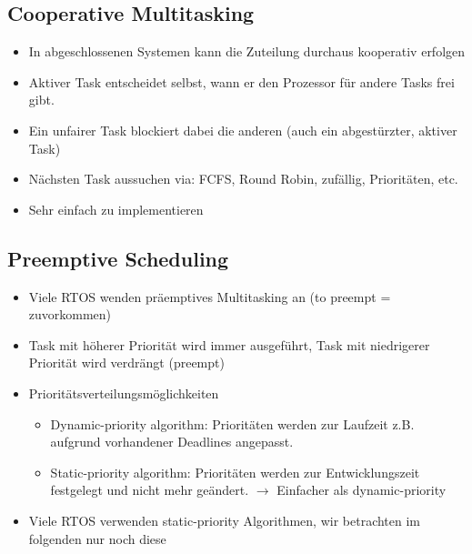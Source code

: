 \subsection{Cooperative Multitasking}
\begin{itemize}
  \item In abgeschlossenen Systemen kann die Zuteilung durchaus kooperativ erfolgen
  \item Aktiver Task entscheidet selbst, wann er den Prozessor für andere Tasks frei gibt.
  \item Ein unfairer Task blockiert dabei die anderen (auch ein abgestürzter, aktiver Task)
  \item Nächsten Task aussuchen via: FCFS, Round Robin, zufällig, Prioritäten, etc.
  \item Sehr einfach zu implementieren
\end{itemize}

\subsection{Preemptive Scheduling}
\begin{itemize}
  \item Viele RTOS wenden präemptives Multitasking an (to preempt = zuvorkommen)
  \item Task mit höherer Priorität wird immer ausgeführt, Task mit niedrigerer Priorität wird verdrängt (preempt)
  \item Prioritätsverteilungsmöglichkeiten
  \begin{itemize}
    \item Dynamic-priority algorithm: Prioritäten werden zur Laufzeit z.B. aufgrund vorhandener Deadlines angepasst.
    \item Static-priority algorithm: Prioritäten werden zur Entwicklungszeit festgelegt und nicht mehr geändert. $\rightarrow$ Einfacher als dynamic-priority
  \end{itemize}
  \item Viele RTOS verwenden static-priority Algorithmen, wir betrachten im folgenden nur noch diese
\end{itemize}

